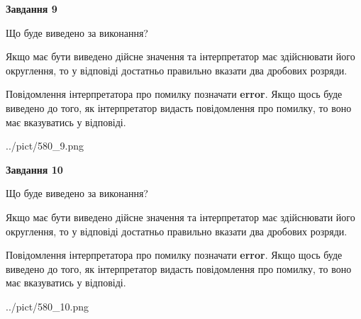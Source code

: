 \documentclass[12pt, ukrainian]{article}
\begin{document}
{\begin {Large}
{\begin {center}\textbf{Завдання 9}\end {center}}\par
Що буде виведено за виконання? \par

Якщо має бути виведено дійсне значення та інтерпретатор має здійснювати його округлення, 
то у відповіді достатньо правильно вказати два дробових розряди.

Повідомлення інтерпретатора про помилку позначати \textbf{error}.
Якщо щось буде виведено до того, як інтерпретатор видасть повідомлення про помилку, 
то воно має вказуватись у відповіді. \par

\begin{center}
	{../pict/580_9.png}
\end{center}
\newpage

{\begin {center}\textbf{Завдання 10}\end {center}}\par
Що буде виведено за виконання? \par

Якщо має бути виведено дійсне значення та інтерпретатор має здійснювати його округлення, 
то у відповіді достатньо правильно вказати два дробових розряди.

Повідомлення інтерпретатора про помилку позначати \textbf{error}.
Якщо щось буде виведено до того, як інтерпретатор видасть повідомлення про помилку, 
то воно має вказуватись у відповіді. \par

\begin{center}
	{../pict/580_10.png}
\end{center}
\newpage

\end {Large}}
\end{document}

